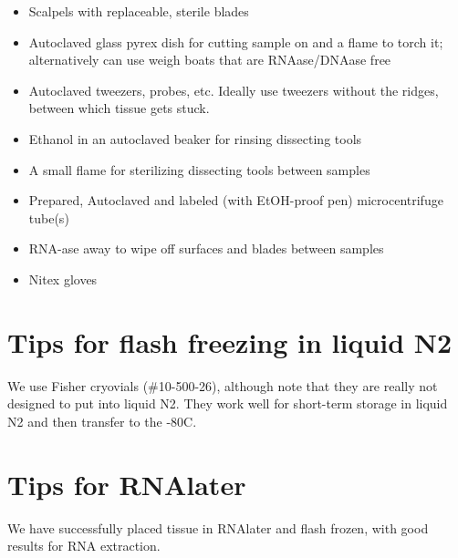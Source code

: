 \documentclass[
  letterpaper,
  DIV=11,
  numbers=noendperiod]{scrreprt}
\begin{document}

\begin{itemize}
\item
  Scalpels with replaceable, sterile blades
\item
  Autoclaved glass pyrex dish for cutting sample on and a flame to torch
  it; alternatively can use weigh boats that are RNAase/DNAase free
\item
  Autoclaved tweezers, probes, etc. Ideally use tweezers without the
  ridges, between which tissue gets stuck.
\item
  Ethanol in an autoclaved beaker for rinsing dissecting tools
\item
  A small flame for sterilizing dissecting tools between samples
\item
  Prepared, Autoclaved and labeled (with EtOH-proof pen) microcentrifuge
  tube(s)
\item
  RNA-ase away to wipe off surfaces and blades between samples
\item
  Nitex gloves
\end{itemize}

\hypertarget{tips-for-flash-freezing-in-liquid-n2}{%
\section*{\texorpdfstring{\textbf{Tips for flash freezing in liquid
N2}}{Tips for flash freezing in liquid N2}}\label{tips-for-flash-freezing-in-liquid-n2}}


We use Fisher cryovials (\#10-500-26), although note that they are
really not designed to put into liquid N2. They work well for short-term
storage in liquid N2 and then transfer to the -80C.

\hypertarget{tips-for-rnalater}{%
\section*{\texorpdfstring{\textbf{Tips for
RNAlater}}{Tips for RNAlater}}\label{tips-for-rnalater}}


We have successfully placed tissue in RNAlater and flash frozen, with
good results for RNA extraction.
\end{document}
